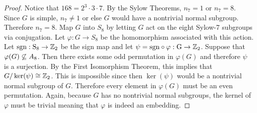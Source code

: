 \documentclass[../AlgebraQualSolutions.tex]{subfiles}
\begin{document}
\begin{proof}
    Notice that $168 = 2^3 \cdot 3 \cdot 7$. By the Sylow Theorems, $n_7 = 1$ or $n_7 = 8$. Since $G$ is simple, $n_7 \neq 1$ or else $G$ would have a nontrivial normal subgroup. Therefore $n_7 = 8$. Map $G$ into $S_8$ by letting $G$ act on the eight Sylow-7 subgroups via conjugation. Let $\varphi: G \to S_8$ be the homomorphism associated with this action. Let $\rm{sgn}: S_8 \to \mathbb{Z}_2$ be the sign map and let $\psi = \rm{sgn}\circ \varphi: G \to \mathbb{Z}_2$. Suppose that $\varphi(G) \not\subseteq A_8$. Then there exists some odd permutation in $\varphi(G)$ and therefore $\psi$ is a surjection. By the First Isomorphism Theorem, this implies that $G/\ker(\psi) \cong \mathbb{Z}_2$. This is impossible since then $\ker(\psi)$ would be a nontrivial normal subgroup of $G$. Therefore every element in $\varphi(G)$ must be an even permutation. Again, because $G$ has no nontrivial normal subgroups, the kernel of $\varphi$ must be trivial meaning that $\varphi$ is indeed an embedding.
\end{proof}
\end{document}
